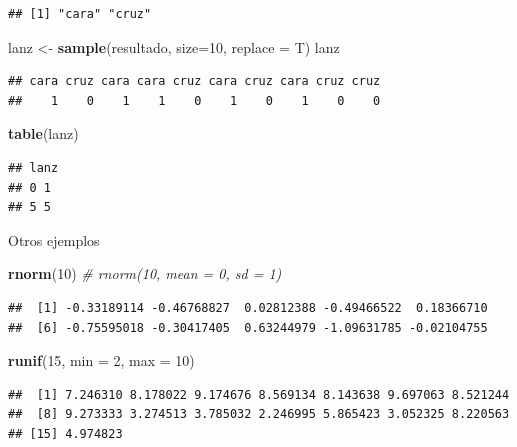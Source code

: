\documentclass[]{book}
\newenvironment{Shaded}{\begin{snugshade}}{\end{snugshade}}
\newcommand{\CommentTok}[1]{\textcolor[rgb]{0.56,0.35,0.01}{\textit{#1}}}
\newcommand{\DataTypeTok}[1]{\textcolor[rgb]{0.13,0.29,0.53}{#1}}
\newcommand{\DecValTok}[1]{\textcolor[rgb]{0.00,0.00,0.81}{#1}}
\newcommand{\KeywordTok}[1]{\textcolor[rgb]{0.13,0.29,0.53}{\textbf{#1}}}
\newcommand{\NormalTok}[1]{#1}
\newcommand{\StringTok}[1]{\textcolor[rgb]{0.31,0.60,0.02}{#1}}
\begin{document}
\begin{verbatim}
## [1] "cara" "cruz"
\end{verbatim}

\begin{Shaded}
\begin{Highlighting}[]
\NormalTok{lanz <-}\StringTok{ }\KeywordTok{sample}\NormalTok{(resultado, }\DataTypeTok{size=}\DecValTok{10}\NormalTok{, }\DataTypeTok{replace =}\NormalTok{ T)}
\NormalTok{lanz}
\end{Highlighting}
\end{Shaded}

\begin{verbatim}
## cara cruz cara cara cruz cara cruz cara cruz cruz 
##    1    0    1    1    0    1    0    1    0    0
\end{verbatim}

\begin{Shaded}
\begin{Highlighting}[]
\KeywordTok{table}\NormalTok{(lanz)}
\end{Highlighting}
\end{Shaded}

\begin{verbatim}
## lanz
## 0 1 
## 5 5
\end{verbatim}

Otros ejemplos

\begin{Shaded}
\begin{Highlighting}[]
\KeywordTok{rnorm}\NormalTok{(}\DecValTok{10}\NormalTok{)  }\CommentTok{# rnorm(10, mean = 0, sd = 1)}
\end{Highlighting}
\end{Shaded}

\begin{verbatim}
##  [1] -0.33189114 -0.46768827  0.02812388 -0.49466522  0.18366710
##  [6] -0.75595018 -0.30417405  0.63244979 -1.09631785 -0.02104755
\end{verbatim}

\begin{Shaded}
\begin{Highlighting}[]
\KeywordTok{runif}\NormalTok{(}\DecValTok{15}\NormalTok{, }\DataTypeTok{min =} \DecValTok{2}\NormalTok{, }\DataTypeTok{max =} \DecValTok{10}\NormalTok{)}
\end{Highlighting}
\end{Shaded}

\begin{verbatim}
##  [1] 7.246310 8.178022 9.174676 8.569134 8.143638 9.697063 8.521244
##  [8] 9.273333 3.274513 3.785032 2.246995 5.865423 3.052325 8.220563
## [15] 4.974823
\end{verbatim}
\end{document}
